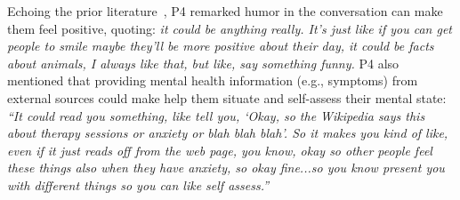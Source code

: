             Echoing the prior literature~\cite{clark2019makes}, P4 remarked humor in the conversation can make them feel positive, quoting:
        		    \textit{it could be anything really. It's just like if you can get people to smile maybe they'll be more positive about their day, it could be facts about animals, I always like that, but like, say something funny.}
            P4 also mentioned that providing mental health information (e.g., symptoms) from external sources could make help them situate and self-assess their mental state:
                \textit{``It could read you something, like tell you, `Okay, so the Wikipedia says this about therapy sessions or anxiety or blah blah blah'. So it makes you kind of like, even if it just reads off from the web page, you know, okay so other people feel these things also when they have anxiety, so okay fine...so you know present you with different things so you can like self assess.'' }
                
            
            